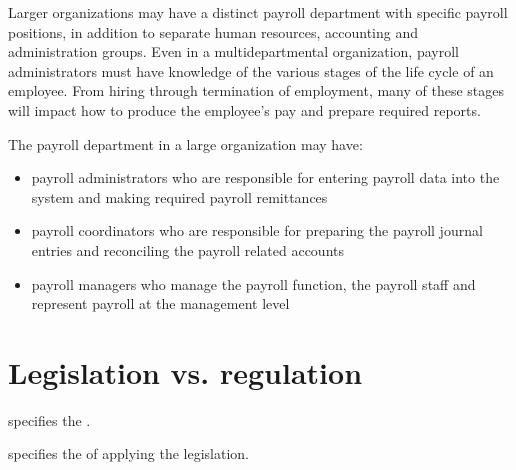 \documentclass[letterpaper,10pt,english]{sphinxmanual}
\begin{document}
\sphinxAtStartPar
Larger organizations may have a distinct payroll department with specific
payroll positions, in addition to separate human resources, accounting and
administration groups. Even in a multi\sphinxhyphen{}departmental organization, payroll
administrators must have knowledge of the various stages of the life cycle
of an employee. From hiring through termination of employment, many of
these stages will impact how to produce the employee’s pay and prepare
required reports.

\sphinxAtStartPar
The payroll department in a large organization may have:
\begin{itemize}
\item {} 
\sphinxAtStartPar
payroll administrators who are responsible for entering payroll data into the system and making required payroll remittances

\item {} 
\sphinxAtStartPar
payroll coordinators who are responsible for preparing the payroll journal entries and reconciling the payroll related accounts

\item {} 
\sphinxAtStartPar
payroll managers who manage the payroll function, the payroll staff and represent payroll at the management level

\end{itemize}


\section{Legislation vs. regulation}
\label{\detokenize{1_introduction:legislation-vs-regulation}}
\sphinxAtStartPar
{} specifies the .

\sphinxAtStartPar
{} specifies the  of applying the legislation.
\end{document}
